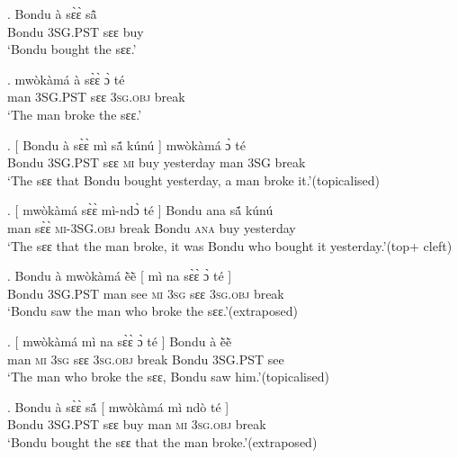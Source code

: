 \documentclass{assets/fieldnotes}
\begin{document}
{\exg. Bondu à sɛ̀ɛ̀ sã̂\\
Bondu \textsc{3SG.PST} sɛɛ buy\\
`Bondu bought the sɛɛ.’

\exg. mwòkàmá à sɛ̀ɛ̀ ɔ̀ té\\
man \textsc{3SG.PST} sɛɛ \textsc{3sg.obj} break\\
`The man broke the sɛɛ.’

\exg. {[} Bondu à sɛ̀ɛ̀ mì sã́ kúnú {]} mwòkàmá ɔ̀ té\\
{} Bondu \textsc{3SG.PST} sɛɛ \textsc{mi} buy yesterday {} man \textsc{3SG} break\\
`The sɛɛ that Bondu bought yesterday, a man broke it.’\hfill{(topicalised)}\label{man_broke_bondu_bought_topicalised}

\exg. {[} mwòkàmá sɛ̀ɛ̀ mì-ndɔ̀ té {]} Bondu ana sã́ kúnú\\
{} man sɛ̀ɛ̀ \textsc{mi}-\textsc{3SG.obj} break {} Bondu \textsc{ana} buy yesterday\\
`The sɛɛ that the man broke, it was Bondu who bought it yesterday.’\hfill{(top+ cleft)}\label{man_broke_bondu_bought_cleft}

\exg. Bondu à mwòkàmá ẽ̀ẽ̀ {[} mì na sɛ̀ɛ̀ ɔ̀ té {]}\\
Bondu \textsc{3SG.PST} man see {} \textsc{mi} \textsc{3sg} sɛɛ \textsc{3sg.obj} break {}\\
`Bondu saw the man who broke the sɛɛ.’\hfill{(extraposed)}\label{bondu_see_man_break_extraposed}

\exg. {[} mwòkàmá mì na sɛ̀ɛ̀ ɔ̀ té {]} Bondu à ẽ̀ẽ̀\\
{} man \textsc{mi} \textsc{3sg} sɛɛ \textsc{3sg.obj} break {} Bondu \textsc{3SG.PST} see\\
`The man who broke the sɛɛ, Bondu saw him.’\hfill{(topicalised)}\label{bondu_see_man_break_topicalised}\\


\exg. Bondu à sɛ̀ɛ̀ sã́ {[} mwòkàmá mì ndò té {]}\\
Bondu \textsc{3SG.PST} sɛɛ buy {} man \textsc{mi} \textsc{3sg.obj} break {}\\
`Bondu bought the sɛɛ that the man broke.'\hfill{(extraposed)}\label{bondu_bought_man_break_extraposed}

}
\end{document}
